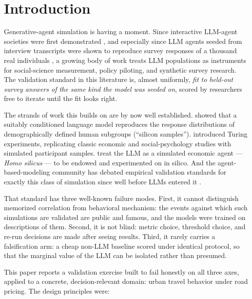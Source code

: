 \documentclass[11pt]{article}
\begin{document}
\section{Introduction}
\label{sec:intro}

Generative-agent simulation is having a moment. Since interactive
LLM-agent societies were first demonstrated \citep{park2023generative},
and especially since LLM agents seeded from interview transcripts were
shown to reproduce survey responses of a thousand real individuals
\citep{park2024thousand}, a growing body of work treats LLM populations
as instruments for social-science measurement, policy piloting, and
synthetic survey research. The validation standard in this literature
is, almost uniformly, \emph{fit to held-out survey answers of the same
kind the model was seeded on}, scored by researchers free to iterate
until the fit looks right.

The strands of work this builds on are by now well established.
\citet{argyle2023} showed that a suitably conditioned language model
reproduces the response distributions of demographically defined human
subgroups (``silicon samples''). \citet{aher2023} introduced Turing
experiments, replicating classic economic and social-psychology
studies with simulated participant samples. \citet{horton2023} treat
the LLM as a simulated economic agent --- \emph{Homo silicus} --- to be
endowed and experimented on in silico. And the agent-based-modeling
community has debated empirical validation standards for exactly this
class of simulation since well before LLMs entered it
\citep{windrum2007}.

That standard has three well-known failure modes. First, it cannot
distinguish memorized correlation from behavioral mechanism: the events
against which such simulations are validated are public and famous, and
the models were trained on descriptions of them. Second, it is not
blind: metric choice, threshold choice, and re-run decisions are made
after seeing results. Third, it rarely carries a falsification arm: a
cheap non-LLM baseline scored under identical protocol, so that the
marginal value of the LLM can be isolated rather than presumed.

This paper reports a validation exercise built to fail honestly on all
three axes, applied to a concrete, decision-relevant domain: urban
travel behavior under road pricing. The design principles were:
\end{document}
